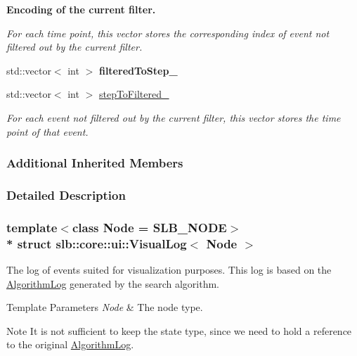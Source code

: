 \begin{Indent}{\bf Encoding of the current filter.}\par
{\em For each time point, this vector stores the corresponding index of event not filtered out by the current filter. }\begin{DoxyCompactItemize}
\item 
std\+::vector$<$ int $>$ {\bfseries filtered\+To\+Step\+\_\+}\hypertarget{structslb_1_1core_1_1ui_1_1VisualLog_a334a99acd3c57ff7e752afde78a5f04e}{}\label{structslb_1_1core_1_1ui_1_1VisualLog_a334a99acd3c57ff7e752afde78a5f04e}

\item 
std\+::vector$<$ int $>$ \hyperlink{structslb_1_1core_1_1ui_1_1VisualLog_a9c0651dd1f4c0975decad0470d908cef}{step\+To\+Filtered\+\_\+}\hypertarget{structslb_1_1core_1_1ui_1_1VisualLog_a9c0651dd1f4c0975decad0470d908cef}{}\label{structslb_1_1core_1_1ui_1_1VisualLog_a9c0651dd1f4c0975decad0470d908cef}

\begin{DoxyCompactList}\small\item\em For each event not filtered out by the current filter, this vector stores the time point of that event. \end{DoxyCompactList}\end{DoxyCompactItemize}
\end{Indent}
\subsubsection*{Additional Inherited Members}


\subsubsection{Detailed Description}
\subsubsection*{template$<$class Node = S\+L\+B\+\_\+\+N\+O\+DE$>$\\*
struct slb\+::core\+::ui\+::\+Visual\+Log$<$ Node $>$}

The log of events suited for visualization purposes. This log is based on the \hyperlink{structslb_1_1core_1_1ui_1_1AlgorithmLog}{Algorithm\+Log} generated by the search algorithm. 


\begin{DoxyTemplParams}{Template Parameters}
{\em Node} & The node type. \\
\hline
\end{DoxyTemplParams}
\begin{DoxyNote}{Note}
It is not sufficient to keep the state type, since we need to hold a reference to the original \hyperlink{structslb_1_1core_1_1ui_1_1AlgorithmLog}{Algorithm\+Log}. 
\end{DoxyNote}


